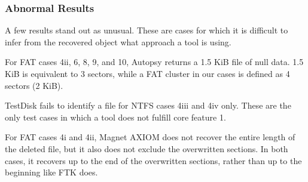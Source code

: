 \subsubsection{Abnormal Results}
A few results stand out as unusual.
These are cases for which it is difficult to infer from the recovered object what approach a tool is using.

For FAT cases 4ii, 6, 8, 9, and 10, Autopsy returns a 1.5 KiB file of null data.
1.5 KiB is equivalent to 3 sectors, while a FAT cluster in our cases is defined as 4 sectors (2 KiB).

TestDisk fails to identify a file for NTFS cases 4iii and 4iv only. 
These are the only test cases in which a tool does not fulfill core feature 1.

For FAT cases 4i and 4ii, Magnet AXIOM does not recover the entire length of the deleted file, but it also does not exclude the overwritten sections. 
In both cases, it recovers up to the end of the overwritten sections, rather than up to the beginning like FTK does.
